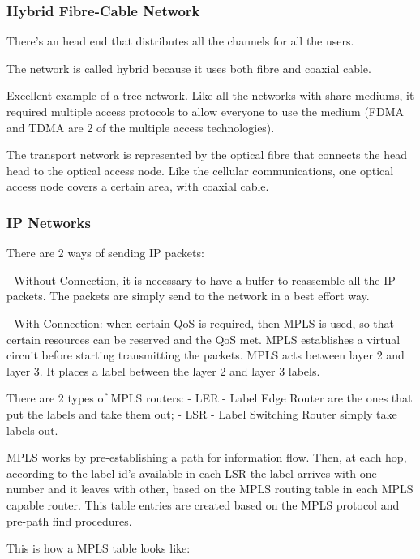 \subsubsection*{Hybrid Fibre-Cable Network}

There's an head end that distributes all the channels for all the users. 

The network is called hybrid because it uses both fibre and coaxial cable.


Excellent example of a tree network. Like all the networks with share mediums, it required multiple access protocols to allow everyone to use the medium (FDMA and TDMA are 2 of the multiple access technologies).



The transport network is represented by the optical fibre that connects the head head to the optical access node. Like the cellular communications, one optical access node covers a certain area, with coaxial cable.


\subsubsection*{IP Networks}

There are 2 ways of sending IP packets:

- Without Connection, it is necessary to have a buffer to reassemble all the IP packets. The packets are simply send to the network in a best effort way.

- With Connection: when certain QoS is required, then MPLS is used, so that certain resources can be reserved and the QoS met.
MPLS establishes a virtual circuit before starting transmitting the packets.
MPLS acts between layer 2 and layer 3. It places a label between the layer 2 and layer 3 labels.

There are 2 types of MPLS routers:
- LER - Label Edge Router are the ones that put the labels and take them out;
- LSR - Label Switching Router simply take labels out.

MPLS works by pre-establishing a path for information flow. Then, at each hop, according to the label id's available in each LSR the label arrives with one number and it leaves with other, based on the MPLS routing table in each MPLS capable router. This table entries are created based on the MPLS protocol and pre-path find procedures.


This is how a MPLS table looks like: 





